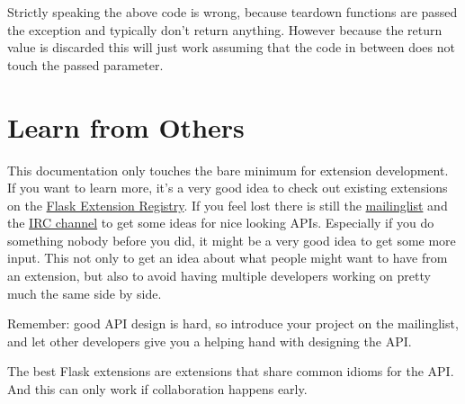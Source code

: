 \documentclass[a4paper,12pt]{sphinxmanual}
\begin{document}
Strictly speaking the above code is wrong, because teardown functions are
passed the exception and typically don't return anything.  However because
the return value is discarded this will just work assuming that the code
in between does not touch the passed parameter.


\section{Learn from Others}
\label{extensiondev:learn-from-others}
This documentation only touches the bare minimum for extension
development.  If you want to learn more, it's a very good idea to check
out existing extensions on the \href{http://flask.pocoo.org/extensions/}{Flask Extension Registry}.  If you feel
lost there is still the \href{http://flask.pocoo.org/mailinglist/}{mailinglist} and the \href{http://flask.pocoo.org/community/irc/}{IRC channel} to get some
ideas for nice looking APIs.  Especially if you do something nobody before
you did, it might be a very good idea to get some more input.  This not
only to get an idea about what people might want to have from an
extension, but also to avoid having multiple developers working on pretty
much the same side by side.

Remember: good API design is hard, so introduce your project on the
mailinglist, and let other developers give you a helping hand with
designing the API.

The best Flask extensions are extensions that share common idioms for the
API.  And this can only work if collaboration happens early.
\end{document}
